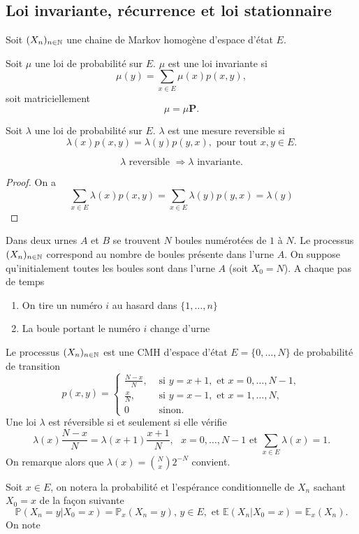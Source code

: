 \subsection{Loi invariante, récurrence et loi stationnaire}
Soit $(X_{n})_{n\in\mathbb{N}}$ une chaine de Markov homogène d'espace d'état $E$. 
\begin{definition}
Soit $\mu$ une loi de probabilité sur $E$. $\mu$ est une loi invariante si 
$$
\mu(y) = \sum_{x\in E}\mu(x)p(x,y),
$$
soit matriciellement $$\mu = \mu \mathbf{P}.$$
\end{definition}
\begin{definition}
Soit $\lambda$ une loi de probabilité sur $E$. $\lambda$ est une mesure reversible si
$$
\lambda(x)p(x,y) = \lambda(y)p(y,x),\text{ pour tout }x,y\in E.
$$
\end{definition}
\begin{prop}
$$
\lambda \text{ reversible }\Rightarrow  \lambda \text{ invariante.}
$$
\end{prop}
\begin{proof}
On a
$$
\sum_{x\in E}\lambda(x)p(x,y)=\sum_{x\in E}\lambda(y)p(y,x) =\lambda(y)
$$
\end{proof}
\begin{ex}
Dans deux urnes $A$ et $B$ se trouvent $N$ boules numérotées de $1$ à $N$. Le processus $(X_n)_{n\in \mathbb{N}}$ correspond au nombre de boules présente dans l'urne $A$. On suppose qu'initialement toutes les boules sont dans l'urne $A$ (soit $X_0 = N$). A chaque pas de temps
\begin{enumerate}
    \item On tire un numéro $i$ au hasard dans $\{1,\ldots, n\}$
    \item La boule portant le numéro $i$ change d'urne
\end{enumerate}
Le processus $(X_n)_{n\in \mathbb{N}}$ est une CMH d'espace d'état $E = \{0,\ldots, N\}$ de probabilité de transition
$$
p(x,y) = \begin{cases}
\frac{N-x}{N},&\text{ si }y = x+1,\text{ et }x = 0,\ldots, N-1, \\
\frac{x}{N},&\text{ si }y = x-1,\text{ et }x = 1,\ldots, N,\\
0&\text{ sinon}.
\end{cases}
$$
Une loi $\lambda$ est réversible si et seulement si elle vérifie
$$
\lambda(x)\frac{N-x}{N} = \lambda(x+1)\frac{x+1}{N},\text{ }x= 0,\ldots, N-1\text{ et }\sum_{x\in E}\lambda(x) = 1.
$$
On remarque alors que $\lambda(x) = \binom{N}{x}2^{-N}$ convient.
\end{ex}
Soit $x\in E$, on notera la probabilité et l'espérance conditionnelle de $X_n$ sachant $X_0=x$ de la façon suivante
$$
\mathbb{P}(X_n=y|X_0=x)=\mathbb{P}_{x}(X_n=y)\text{, }y\in E,\text{ et }\mathbb{E}(X_n|X_0=x)=\mathbb{E}_{x}(X_n).
$$
On note

